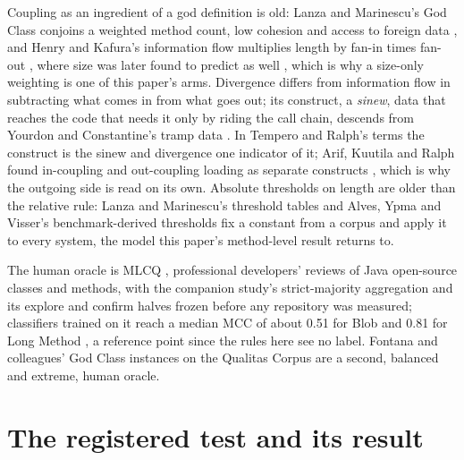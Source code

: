 \documentclass[11pt,a4paper]{article}
\begin{document}
Coupling as an ingredient of a god definition is old: Lanza and Marinescu's
God Class conjoins a weighted method count, low cohesion and access to
foreign data \cite{lanza2006, marinescu2004}, and Henry and Kafura's
information flow multiplies length by fan-in times fan-out
\cite{henry1981}, where size was later found to predict as well
\cite{kitchenham1990, elemam2001}, which is why a size-only weighting is
one of this paper's arms. Divergence differs from information flow in
subtracting what comes in from what goes out; its construct, a
\emph{sinew}, data that reaches the code that needs it only by riding the
call chain, descends from Yourdon and Constantine's tramp data
\cite{yourdon1979}. In Tempero and Ralph's terms \cite{tempero2026metrics} the
construct is the sinew and divergence one indicator of it; Arif, Kuutila
and Ralph found in-coupling and out-coupling loading as separate constructs
\cite{arif2026}, which is why the outgoing side is read on its own.
Absolute thresholds on length are older than the relative rule: Lanza and
Marinescu's threshold tables \cite{lanza2006} and Alves, Ypma and Visser's
benchmark-derived thresholds \cite{alves2010} fix a constant from a corpus
and apply it to every system, the model this paper's method-level result
returns to.

The human oracle is MLCQ \cite{mlcq2020}, professional developers' reviews
of Java open-source classes and methods, with the companion study's
strict-majority aggregation and its explore and confirm halves frozen
before any repository was measured; classifiers trained on it reach a
median MCC of about 0.51 for Blob and 0.81 for Long Method \cite{mlcq2023},
a reference point since the rules here see no label. Fontana and
colleagues' God Class instances on the Qualitas Corpus \cite{fontana2016}
are a second, balanced and extreme, human oracle.

\section{The registered test and its result}
\label{sec:claim}
\end{document}
